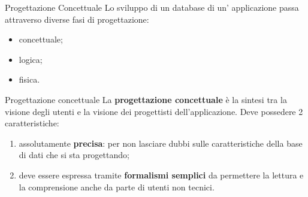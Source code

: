 \begin{frame}{Progettazione Concettuale}
\vspace{.5cm}
Lo sviluppo di un database di un' applicazione passa attraverso diverse fasi di progettazione:
\begin{itemize}[<+->]
    \item concettuale;
    \item logica;
    \item fisica.
\end{itemize}
\pause
\begin{block}{Progettazione concettuale}
    La \textbf{progettazione concettuale} \`e la sintesi tra la visione degli utenti e la visione dei progettisti dell'applicazione.
\pause
Deve possedere 2 caratteristiche:
    \begin{enumerate}[<+->]
        \item assolutamente \textbf{precisa}: per non lasciare dubbi sulle caratteristiche della base di dati che si sta progettando;
        \item deve essere espressa tramite \textbf{formalismi semplici} da permettere la lettura e la comprensione anche da parte di utenti non tecnici.
    \end{enumerate}
\end{block}
\end{frame}
%
